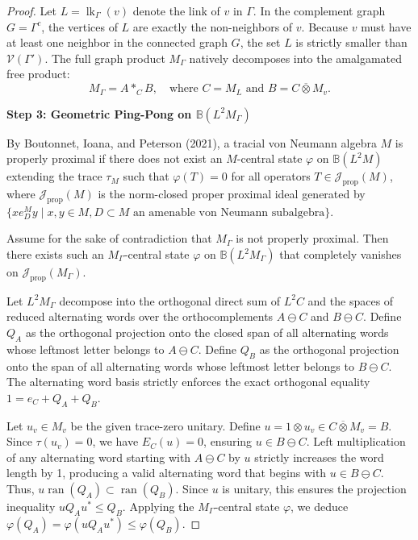 \documentclass[12pt]{article}
\newcommand{\VV}{\mathcal{V}}
\begin{document}
\begin{proof}
Let $L = \operatorname{lk}_\Gamma(v)$ denote the link of $v$ in $\Gamma$. In the complement graph $G = \Gamma^c$, the vertices of $L$ are exactly the non-neighbors of $v$. Because $v$ must have at least one neighbor in the connected graph $G$, the set $L$ is strictly smaller than $\VV(\Gamma')$.
The full graph product $M_\Gamma$ natively decomposes into the amalgamated free product:
\[
M_\Gamma = A \ast_C B, \quad \text{where } C = M_L \text{ and } B = C \overline{\otimes} M_v.
\]

\medskip\noindent\textbf{Step 3: Geometric Ping-Pong on $\mathbb{B}(L^2M_\Gamma)$}

By Boutonnet, Ioana, and Peterson (2021), a tracial von Neumann algebra $M$ is properly proximal if there does not exist an $M$-central state $\varphi$ on $\mathbb{B}(L^2M)$ extending the trace $\tau_M$ such that $\varphi(T) = 0$ for all operators $T \in \mathcal{J}_{\mathrm{prop}}(M)$, where $\mathcal{J}_{\mathrm{prop}}(M)$ is the norm-closed proper proximal ideal generated by $\{x e_D^M y \mid x, y \in M, D \subset M \text{ an amenable von Neumann subalgebra}\}$.

Assume for the sake of contradiction that $M_\Gamma$ is not properly proximal. Then there exists such an $M_\Gamma$-central state $\varphi$ on $\mathbb{B}(L^2M_\Gamma)$ that completely vanishes on $\mathcal{J}_{\mathrm{prop}}(M_\Gamma)$.

Let $L^2M_\Gamma$ decompose into the orthogonal direct sum of $L^2C$ and the spaces of reduced alternating words over the orthocomplements $A \ominus C$ and $B \ominus C$. Define $Q_A$ as the orthogonal projection onto the closed span of all alternating words whose leftmost letter belongs to $A \ominus C$. Define $Q_B$ as the orthogonal projection onto the span of all alternating words whose leftmost letter belongs to $B \ominus C$. The alternating word basis strictly enforces the exact orthogonal equality $1 = e_C + Q_A + Q_B$.

Let $u_v \in M_v$ be the given trace-zero unitary. Define $u = 1 \otimes u_v \in C \overline{\otimes} M_v = B$. Since $\tau(u_v)=0$, we have $E_C(u)=0$, ensuring $u \in B \ominus C$. Left multiplication of any alternating word starting with $A \ominus C$ by $u$ strictly increases the word length by 1, producing a valid alternating word that begins with $u \in B \ominus C$. Thus, $u \operatorname{ran}(Q_A) \subset \operatorname{ran}(Q_B)$. Since $u$ is unitary, this ensures the projection inequality $u Q_A u^* \le Q_B$. Applying the $M_\Gamma$-central state $\varphi$, we deduce $\varphi(Q_A) = \varphi(u Q_A u^*) \le \varphi(Q_B)$.


\end{proof}
\end{document}
